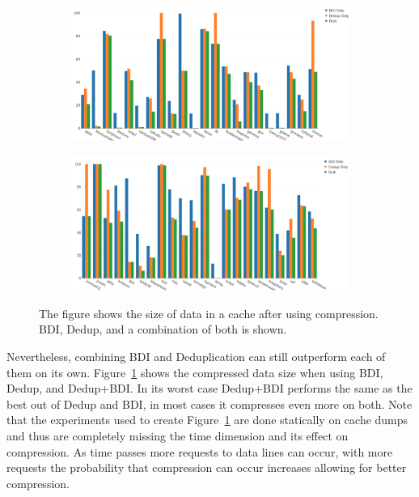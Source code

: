 \begin{figure}
    \begin{subfigure}[t]{\textwidth}
        \includegraphics[width=\textwidth]{CompSize1.png}
    \end{subfigure}
    \begin{subfigure}[b]{\textwidth}
        \includegraphics[width=\textwidth]{CompSize2.png}
    \end{subfigure}
    \caption[Size after compression]{The figure shows the size of data in a cache after using compression. BDI, Dedup, and a combination of both is shown.}
    \label{fig:CompSize}
\end{figure}
Nevertheless, combining BDI and Deduplication can still outperform each of them on its own. Figure~\ref{fig:CompSize} shows the compressed data size when using BDI, Dedup, and Dedup+BDI. In its worst case Dedup+BDI performs the same as the best out of Dedup and BDI, in most cases it compresses even more on both. Note that the experiments used to create Figure~\ref{fig:CompSize} are done statically on cache dumps and thus are completely missing the time dimension and its effect on compression. As time passes more requests to data lines can occur, with more requests the probability that compression can occur increases allowing for better compression.
